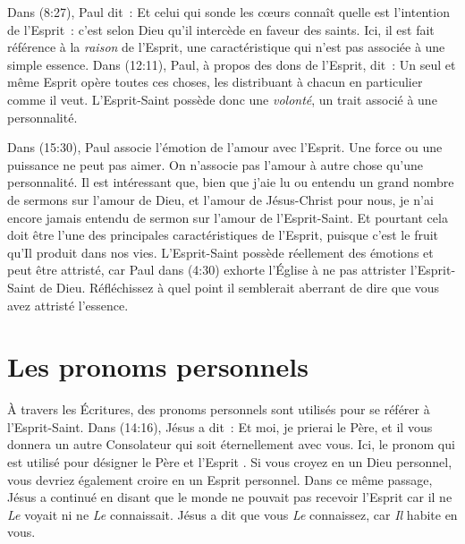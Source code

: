 Dans (8:27), Paul dit~: \Og Et celui qui sonde les cœurs
 connaît quelle est l'intention de l'Esprit~: c'est selon Dieu qu'il
 intercède en faveur des saints. \Fg{} Ici, il est fait référence
 à la \emph{raison} de l'Esprit, une caractéristique qui n'est pas associée à
 une simple essence. Dans (12:11), Paul, à propos des dons de
 l'Esprit, dit~: \Og Un seul et même Esprit opère toutes ces choses, les
 distribuant à chacun en particulier comme il veut. \Fg{} L'Esprit-Saint
 possède donc une \emph{volonté}, un trait associé à une personnalité.

Dans (15:30), Paul associe l'émotion de l'amour avec l'Es\-prit.
 Une force ou une puissance ne peut pas aimer. On n'associe pas l'amour à autre
 chose qu'une personnalité. Il est intéressant que, bien que j'aie lu ou
 entendu un grand nombre de sermons sur l'amour de Dieu, et l'amour de
 Jésus-Christ pour nous, je n'ai encore jamais entendu de sermon sur l'amour de
 l'Esprit-Saint. Et pourtant cela doit être l'une des principales
 caractéristiques de l'Esprit, puisque c'est le fruit qu'Il produit dans nos
 vies.                                    
 L'Esprit-Saint possède réellement des émotions et peut être attristé,
 car Paul dans (4:30) exhorte l'Église à ne pas attrister
 l'Esprit-Saint de Dieu. Réfléchissez à quel point il semblerait aberrant
 de dire que vous avez attristé l'essence.


\section{Les pronoms personnels}

À travers les Écritures, des pronoms personnels sont utilisés pour se
 référer à l'Esprit-Saint. Dans (14:16), Jésus a dit~:
 \Og Et moi, je prierai le Père, et il vous donnera un autre Consolateur
 qui soit éternellement avec vous. \Fg{}
 Ici, le pronom \Og qui \Fg{} est utilisé pour désigner le Père et l'Esprit
 .
 Si vous croyez en un Dieu personnel, vous devriez également croire en
 un Esprit personnel. Dans ce même passage, Jésus a continué en disant
 que le monde ne pouvait pas recevoir l'Esprit car il ne \emph{Le} voyait ni
 ne \emph{Le} connaissait. Jésus a dit que vous \emph{Le} connaissez,
 car \emph{Il} habite en vous.


